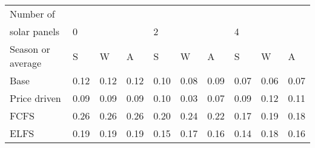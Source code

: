 \begin{table}[h] 
\centering 
\begin{tabular}{l|lll|lll|lll}Number of \\ solar panels&0& & &2& & &4& & \\ \hline 
Season or average & S & W & A & S & W & A & S & W & A \\ \hline 
Base&0.12&0.12&0.12&0.10&0.08&0.09&0.07&0.06&0.07 \\ 
Price driven&0.09&0.09&0.09&0.10&0.03&0.07&0.09&0.12&0.11 \\ 
FCFS&0.26&0.26&0.26&0.20&0.24&0.22&0.17&0.19&0.18 \\ 
ELFS&0.19&0.19&0.19&0.15&0.17&0.16&0.14&0.18&0.16 \\ 
\end{tabular} 
\end{table}